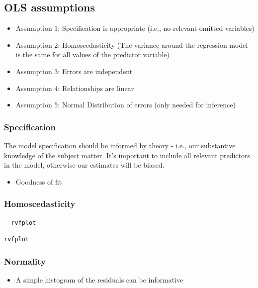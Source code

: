 \documentclass[]{book}
\providecommand{\tightlist}{%
  \setlength{\itemsep}{0pt}\setlength{\parskip}{0pt}}
\begin{document}
\subsection{OLS assumptions}\label{ols-assumptions}

\begin{itemize}
\tightlist
\item
  Assumption 1: Specification is appropriate (i.e., no relevant omitted
  variables)
\item
  Assumption 2: Homoscedasticity (The variance around the regression
  model is the same for all values of the predictor variable)
\item
  Assumption 3: Errors are independent
\item
  Assumption 4: Relationships are linear
\item
  Assumption 5: Normal Distribution of errors (only needed for
  inference)
\end{itemize}

\subsubsection{Specification}\label{specification}

The model specification should be informed by theory - i.e., our
substantive knowledge of the subject matter. It's important to include
all relevant predictors in the model, otherwise our estimates will be
biased.

\begin{itemize}
\tightlist
\item
  Goodness of fit
\end{itemize}

\subsubsection{Homoscedasticity}\label{homoscedasticity}

\begin{verbatim}
  rvfplot
\end{verbatim}

\begin{verbatim}
rvfplot
\end{verbatim}

\subsubsection{Normality}\label{normality}

\begin{itemize}
\tightlist
\item
  A simple histogram of the residuals can be informative
\end{itemize}
\end{document}
